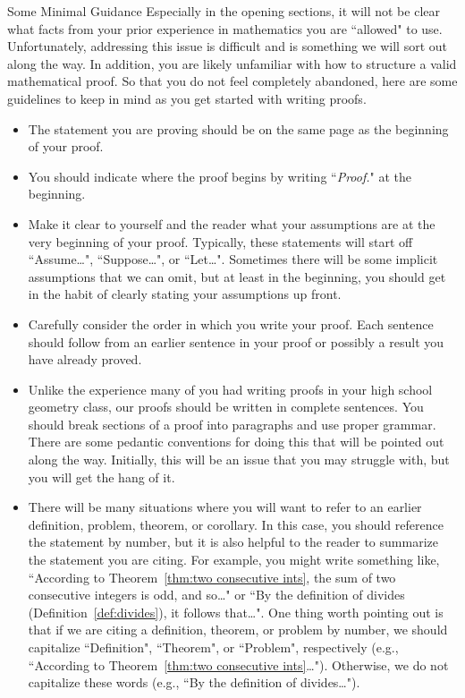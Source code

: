 \begin{section}{Some Minimal Guidance}\label{sec:guidance}
Especially in the opening sections, it will not be clear what facts from your prior experience in mathematics you are ``allowed" to use.  Unfortunately, addressing this issue is difficult and is something we will sort out along the way.  In addition, you are likely unfamiliar with how to structure a valid mathematical proof.  So that you do not feel completely abandoned, here are some guidelines to keep in mind as you get started with writing proofs.

\begin{itemize}
\item The statement you are proving should be on the same page as the beginning of your proof.   
\item You should indicate where the proof begins by writing ``\emph{Proof.}" at the beginning.  
\item Make it clear to yourself and the reader what your assumptions are at the very beginning of your proof. Typically, these statements will start off ``Assume\ldots", ``Suppose\ldots", or ``Let\ldots".  Sometimes there will be some implicit assumptions that we can omit, but at least in the beginning, you should get in the habit of clearly stating your assumptions up front. 
\item Carefully consider the order in which you write your proof. Each sentence should follow from an earlier sentence in your proof or possibly a result you have already proved.
\item Unlike the experience many of you had writing proofs in your high school geometry class, our proofs should be written in complete sentences.  You should break sections of a proof into paragraphs and use proper grammar.  There are some pedantic conventions for doing this that will be pointed out along the way.  Initially, this will be an issue that you may struggle with, but you will get the hang of it.
\item There will be many situations where you will want to refer to an earlier definition, problem, theorem, or corollary.  In this case, you should reference the statement by number, but it is also helpful to the reader to summarize the statement you are citing.  For example, you might write something like, ``According to Theorem~\ref{thm:two consecutive ints}, the sum of two consecutive integers is odd, and so\ldots" or ``By the definition of divides (Definition~\ref{def:divides}), it follows that\ldots". One thing worth pointing out is that if we are citing a definition, theorem, or problem by number, we should capitalize ``Definition", ``Theorem", or ``Problem", respectively (e.g., ``According to Theorem~\ref{thm:two consecutive ints}\ldots"). Otherwise, we do not capitalize these words (e.g., ``By the definition of divides\ldots").

\end{itemize}
\end{section}
